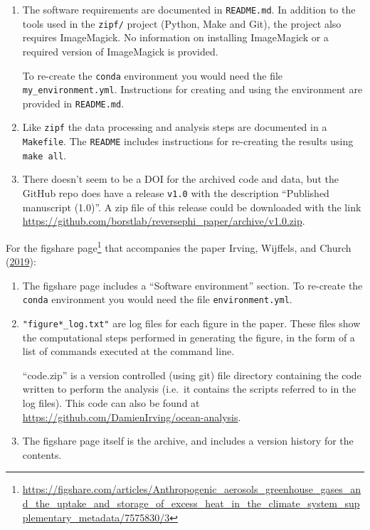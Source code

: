 \documentclass[
]{krantz}
\renewenvironment{quote}{\begin{VF}}{\end{VF}}
\renewcommand{\href}[2]{#2\footnote{\url{#1}}}
\begin{document}
\begin{enumerate}
\def\labelenumi{\arabic{enumi}.}
\item
  The software requirements are documented in \texttt{README.md}.
  In addition to the tools used in the \texttt{zipf/} project (Python, Make and Git), the project also requires ImageMagick.
  No information on installing ImageMagick or a required version of ImageMagick is provided.

  To re-create the \texttt{conda} environment you would need the file \texttt{my\_environment.yml}.
  Instructions for creating and using the environment are provided in \texttt{README.md}.
\item
  Like \texttt{zipf} the data processing and analysis steps are documented in a \texttt{Makefile}.
  The \texttt{README} includes instructions for re-creating the results using \texttt{make\ all}.
\item
  There doesn't seem to be a DOI for the archived code and data,
  but the GitHub repo does have a release \texttt{v1.0} with the description ``Published manuscript (1.0)''.
  A zip file of this release could be downloaded with the link \url{https://github.com/borstlab/reversephi_paper/archive/v1.0.zip}.
\end{enumerate}

For \href{https://figshare.com/articles/Anthropogenic_aerosols_greenhouse_gases_and_the_uptake_and_storage_of_excess_heat_in_the_climate_system_supplementary_metadata/7575830/3}{the figshare page} that accompanies the paper Irving, Wijffels, and Church (\protect\hyperlink{ref-Irving2019}{2019}):

\begin{enumerate}
\def\labelenumi{\arabic{enumi}.}
\item
  The figshare page includes a ``Software environment'' section. To re-create the \texttt{conda} environment you would need the file \texttt{environment.yml}.
\item
  \begin{quote}
  \texttt{"figure*\_log.txt"} are log files for each figure in the paper. These files show the computational steps performed in generating the figure, in the form of a list of commands executed at the command line.
  \end{quote}

  \begin{quote}
  ``code.zip'' is a version controlled (using git) file directory containing the code written to perform the analysis (i.e.~it contains the scripts referred to in the log files). This code can also be found at \url{https://github.com/DamienIrving/ocean-analysis}.
  \end{quote}
\item
  The figshare page itself is the archive, and includes a version history for the contents.
\end{enumerate}
\end{document}
